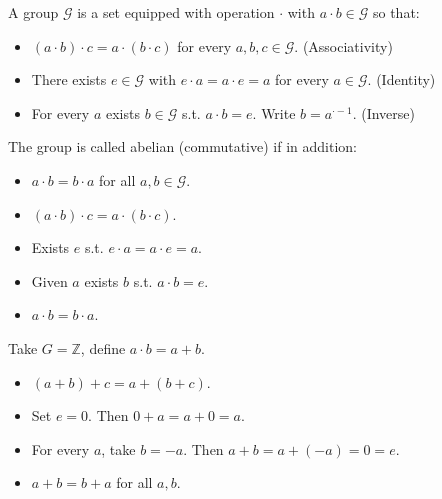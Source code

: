 \begin{frame}
\begin{definition}
A group $\mathcal G$ is a set equipped with operation $\cdot$ with $a\cdot b \in \mathcal G$ so that:
\begin{itemize}
\item  $(a\cdot b)\cdot c = a\cdot (b\cdot c)$ for every $a,b,c\in \mathcal G$. \hfill (Associativity)
\item There exists $e\in \mathcal G$ with $e\cdot a = a \cdot e = a$ for every $a\in \mathcal G$. \hfill (Identity)
\item For every $a$ exists $b\in \mathcal G$ s.t. $a\cdot b = e$. Write $b =  a^{\cdot -1}$. \hfill (Inverse)

\end{itemize}
\end{definition}
\begin{definition}
	The group is called abelian (commutative) if in addition: 
\begin{itemize}
\item $a\cdot b = b\cdot a$ for all $a,b\in \mathcal G$.
\end{itemize}
\end{definition}

\end{frame}

\begin{frame}
\begin{itemize}
\item $(a\cdot b)\cdot c= a\cdot(b\cdot c)$.
\item Exists $e$ s.t. $e\cdot a =a\cdot e = a$.
\item Given $a$ exists $b$ s.t. $a\cdot b = e$.
\item $a\cdot b = b\cdot a$. 
\end{itemize}

\begin{example}
Take $G = \mathbb Z$, define $a \cdot b =a + b$. 
\begin{itemize}
\item $(a+b)+c = a+ (b+c)$.
\item Set $e=0 $. Then $0+a= a+ 0 = a$.
\item For every $a$, take $b=-a$. Then $a + b = a+ (-a) = 0=e$.
\item $a+b=b+a$ for all $a,b$.
\end{itemize}
\end{example}

\end{frame}